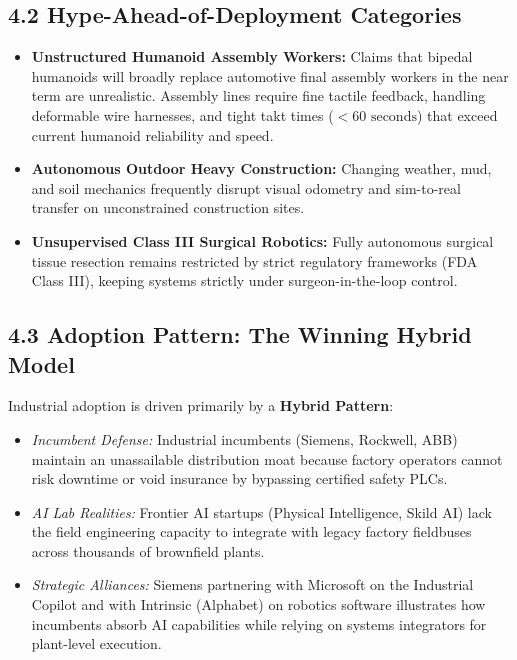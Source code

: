 \documentclass[11pt,a4paper]{article}
\begin{document}
\subsection{4.2 Hype-Ahead-of-Deployment Categories}
\begin{itemize}
    \item \textbf{Unstructured Humanoid Assembly Workers:} Claims that bipedal humanoids will broadly replace automotive final assembly workers in the near term are unrealistic. Assembly lines require fine tactile feedback, handling deformable wire harnesses, and tight takt times ($<60\text{ seconds}$) that exceed current humanoid reliability and speed.
    \item \textbf{Autonomous Outdoor Heavy Construction:} Changing weather, mud, and soil mechanics frequently disrupt visual odometry and sim-to-real transfer on unconstrained construction sites.
    \item \textbf{Unsupervised Class III Surgical Robotics:} Fully autonomous surgical tissue resection remains restricted by strict regulatory frameworks (FDA Class III), keeping systems strictly under surgeon-in-the-loop control.
\end{itemize}

\subsection{4.3 Adoption Pattern: The Winning Hybrid Model}
Industrial adoption is driven primarily by a \textbf{Hybrid Pattern}:
\begin{itemize}
    \item \textit{Incumbent Defense:} Industrial incumbents (Siemens, Rockwell, ABB) maintain an unassailable distribution moat because factory operators cannot risk downtime or void insurance by bypassing certified safety PLCs.
    \item \textit{AI Lab Realities:} Frontier AI startups (Physical Intelligence, Skild AI) lack the field engineering capacity to integrate with legacy factory fieldbuses across thousands of brownfield plants.
    \item \textit{Strategic Alliances:} Siemens partnering with Microsoft on the Industrial Copilot and with Intrinsic (Alphabet) on robotics software illustrates how incumbents absorb AI capabilities while relying on systems integrators for plant-level execution.
\end{itemize}

\end{document}
